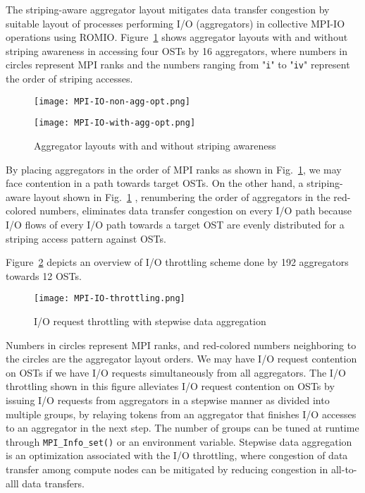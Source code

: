 \documentclass{jhps}
\begin{document}
The striping-aware aggregator layout mitigates data transfer congestion
by suitable layout of processes performing I/O (aggregators)
in collective MPI-IO operations using ROMIO.
Figure~\ref{fig:AGG_STR_AWARE} shows aggregator layouts with and
without striping awareness in accessing four OSTs by 16 aggregators,
where numbers in circles represent MPI ranks
and the numbers ranging from "{\tt i}" to "{\tt iv}" represent
the order of striping accesses.
%
\begin{figure}[htb]
\centering
\begin{minipage}[t]{0.42\textwidth}
\centering
\texttt{[image: MPI-IO-non-agg-opt.png]}
\label{fig:WO_STR_AWARE}
\end{minipage}
\noindent
\begin{minipage}[t]{0.42\textwidth}
\centering
\texttt{[image: MPI-IO-with-agg-opt.png]}
\label{fig:WITH_STR_AWARE}
\end{minipage}
\caption{Aggregator layouts with and without striping awareness}
\label{fig:AGG_STR_AWARE}
\end{figure}
%
By placing aggregators in the order of MPI ranks
as shown in Fig.~\ref{fig:AGG_STR_AWARE},
we may face contention in a path towards target OSTs.
On the other hand, a striping-aware layout shown in
Fig.~\ref{fig:AGG_STR_AWARE} ,
renumbering the order of aggregators in the red-colored numbers,
eliminates data transfer congestion on every I/O path
because I/O flows of every I/O path towards a target OST are
evenly distributed for a striping access pattern against OSTs.

Figure~\ref{fig:IO_THROT} depicts an overview of I/O throttling
scheme done by 192 aggregators towards 12 OSTs.
%
\begin{figure}[htb]
\centering
\texttt{[image: MPI-IO-throttling.png]}
\caption{I/O request throttling with stepwise data aggregation}
\label{fig:IO_THROT}
\end{figure}
%
Numbers in circles represent MPI ranks, and red-colored numbers neighboring
to the circles are the aggregator layout orders.
We may have I/O request contention on OSTs
if we have I/O requests simultaneously from all aggregators.
The I/O throttling shown in this figure alleviates I/O request contention
on OSTs by issuing I/O requests from aggregators in a stepwise manner
as divided into multiple groups, by relaying tokens from an aggregator that finishes
I/O accesses to an aggregator in the next step.
The number of groups can be tuned at runtime through {\tt MPI\_Info\_set()} or an environment variable.
Stepwise data aggregation is an optimization associated
with the I/O throttling, where congestion of data transfer
among compute nodes can be mitigated by reducing congestion in all-to-alll data transfers.
\end{document}
